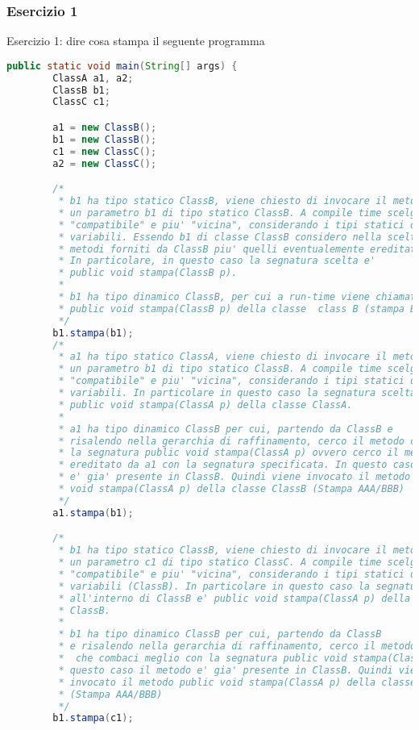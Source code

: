 \documentclass{article}
\begin{document}
\subsubsection{Esercizio 1}
\begin{framed}
Esercizio 1: dire cosa stampa il seguente programma 
\end{framed}
\begin{lstlisting}[language=Java,escapechar=|]
public static void main(String[] args) {
		ClassA a1, a2;
		ClassB b1;
		ClassC c1;

		a1 = new ClassB();
		b1 = new ClassB();
		c1 = new ClassC();
		a2 = new ClassC();

		/*
		 * b1 ha tipo statico ClassB, viene chiesto di invocare il metodo stampa su
		 * un parametro b1 di tipo statico ClassB. A compile time scelgo la segnatura
		 * "compatibile" e piu' "vicina", considerando i tipi statici delle
		 * variabili. Essendo b1 di classe ClassB considero nella scelta tutti i 
		 * metodi forniti da ClassB piu' quelli eventualemente ereditati. 
		 * In particolare, in questo caso la segnatura scelta e'
		 * public void stampa(ClassB p).
		 * 
		 * b1 ha tipo dinamico ClassB, per cui a run-time viene chiamato il metodo
		 * public void stampa(ClassB p) della classe  class B (stampa BBB)
		 */
		b1.stampa(b1);
		/*
		 * a1 ha tipo statico ClassA, viene chiesto di invocare il metodo stampa su
		 * un parametro b1 di tipo statico ClassB. A compile time scelgo la segnatura
		 * "compatibile" e piu' "vicina", considerando i tipi statici delle
		 * variabili. In particolare in questo caso la segnatura scelta e'
		 * public void stampa(ClassA p) della classe ClassA.
		 * 
		 * a1 ha tipo dinamico ClassB per cui, partendo da ClassB e
		 * risalendo nella gerarchia di raffinamento, cerco il metodo che combaci con
		 * la segnatura public void stampa(ClassA p) ovvero cerco il metodo
		 * ereditato da a1 con la segnatura specificata. In questo caso il metodo
		 * e' gia' presente in ClassB. Quindi viene invocato il metodo public
		 * void stampa(ClassA p) della classe ClassB (Stampa AAA/BBB)
		 */
		a1.stampa(b1);

		/*
		 * b1 ha tipo statico ClassB, viene chiesto di invocare il metodo stampa su
		 * un parametro c1 di tipo statico ClassC. A compile time scelgo la segnatura
		 * "compatibile" e piu' "vicina", considerando i tipi statici delle
		 * variabili (ClassB). In particolare in questo caso la segnatura scelta
		 * all'interno di ClassB e' public void stampa(ClassA p) della classe
		 * ClassB.
		 * 
		 * b1 ha tipo dinamico ClassB per cui, partendo da ClassB
		 * e risalendo nella gerarchia di raffinamento, cerco il metodo ereditato
		 *  che combaci meglio con la segnatura public void stampa(ClassA p). In
		 * questo caso il metodo e' gia' presente in ClassB. Quindi viene
		 * invocato il metodo public void stampa(ClassA p) della classe ClassB
		 * (Stampa AAA/BBB)
		 */
		b1.stampa(c1);


\end{lstlisting}
\end{document}
